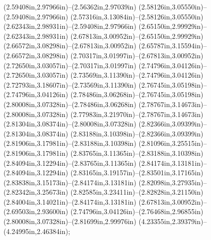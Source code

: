 (2.59408in,2.97966in)--(2.56362in,2.97039in) (2.58126in,3.05550in)--(2.59408in,2.97966in) (2.57316in,3.13084in)--(2.58126in,3.05550in) (2.62343in,2.98931in)--(2.59408in,2.97966in) (2.65150in,2.99929in)--(2.62343in,2.98931in) (2.67813in,3.00952in)--(2.65150in,2.99929in) (2.66572in,3.08298in)--(2.67813in,3.00952in) (2.65787in,3.15594in)--(2.66572in,3.08298in) (2.70317in,3.01997in)--(2.67813in,3.00952in) (2.72650in,3.03057in)--(2.70317in,3.01997in) (2.74796in,3.04126in)--(2.72650in,3.03057in) (2.73569in,3.11390in)--(2.74796in,3.04126in) (2.72793in,3.18607in)--(2.73569in,3.11390in) (2.76745in,3.05198in)--(2.74796in,3.04126in) (2.78486in,3.06268in)--(2.76745in,3.05198in) (2.80008in,3.07328in)--(2.78486in,3.06268in) (2.78767in,3.14673in)--(2.80008in,3.07328in) (2.77983in,3.21970in)--(2.78767in,3.14673in) (2.81304in,3.08374in)--(2.80008in,3.07328in) (2.82366in,3.09399in)--(2.81304in,3.08374in) (2.83188in,3.10398in)--(2.82366in,3.09399in) (2.81906in,3.17981in)--(2.83188in,3.10398in) (2.81096in,3.25515in)--(2.81906in,3.17981in) (2.83765in,3.11365in)--(2.83188in,3.10398in) (2.84094in,3.12294in)--(2.83765in,3.11365in) (2.84174in,3.13181in)--(2.84094in,3.12294in) (2.83165in,3.19157in)--(2.83501in,3.17165in) (2.83838in,3.15173in)--(2.84174in,3.13181in) (2.82098in,3.27935in)--(2.82342in,3.25673in) (2.82585in,3.23411in)--(2.82828in,3.21150in) (2.84004in,3.14021in)--(2.84174in,3.13181in) (2.67813in,3.00952in)--(2.69503in,2.93600in) (2.74796in,3.04126in)--(2.76468in,2.96855in) (2.80008in,3.07328in)--(2.81699in,2.99976in) (4.23355in,2.39379in)--(4.24995in,2.46384in);
